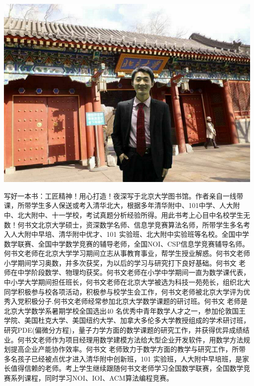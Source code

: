 \documentclass[12pt,twiside,a4paper]{ctexbook}
\numberwithin{chapter}{part}
\begin{document}

\author
{
Peking University\\
北京大学\\
ShuwenHe\\
何书文\\
1201220707@pku.edu.cn
}

\centerline{\includegraphics{shuwenhe.png}}
写好一本书：工匠精神！用心打造！夜深写于北京大学图书馆。作者亲自一线带课，所带学生多人保送或考入清华北大，根据多年清华附中、101中学、人大附中、北大附中、十一学校，考试真题分析经验所得。用此书考上心目中名校学生无数！何书文北京大学硕士，资深数学名师、信息学竞赛算法名师，所带学生多名考入人大附中早培、清华附中优才、101 实验班、北大附中实验班等名校。全国中学数学联赛、全国中学数学竞赛的辅导老师，全国NOI、CSP信息学竞赛辅导名师。何书文老师在北京大学学习期间立志从事教育事业，帮学生授业解惑。何书文老师小学期间学习奥数，并多次获奖，为以后的学习与研究打下良好基础。何书文 老师在中学阶段数学、物理均获奖。何书文老师在小学中学期间一直为数学课代表，中小学大学期间担任班长，何书文老师在北京大学被选为科技一苑苑长，组织北大同学积极参与校各项活动，积极参与校学生会工作，何书文老师被北京大学评为优秀入党积极分子.何书文老师经常参加北京大学数学课题的研讨班。何书文 老师是北京大学数学系暑期学校全国选出40 名优秀中青年数学人才之一，参加伦敦国王学院、美国杜克大学、美国纽约大学、加拿大多伦多大学教授组成的学术研讨班，研究PDE(偏微分方程)，量子力学方面的数学课题的研究工作，并获得优异成绩结业。何书文老师作为项目经理用数学建模方法给大型企业开发软件，用数学方法规划提高企业产能协作效率。何书文 老师致力于数学方面的教学与研究工作，所带多名孩子已经被点优才进入清华附中创新班，101 实验班，人大附中早培班，是家长值得信赖的老师。考上学生继续跟随何书文老师学习全国数学联赛，全国数学竞赛系列课程，同时学习NOI、IOI、ACM算法编程竞赛。
\end{document}
